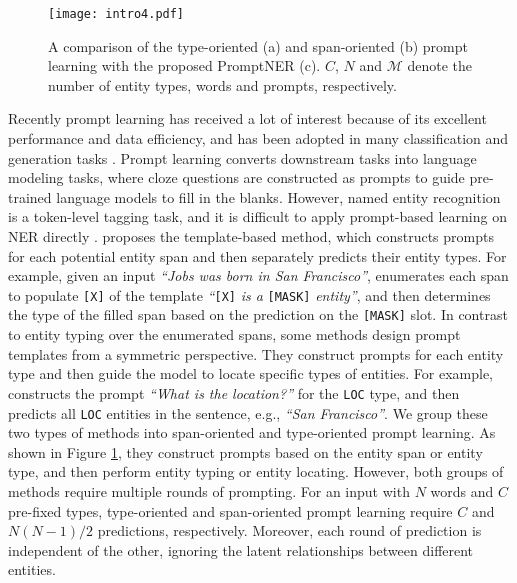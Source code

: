 \documentclass[11pt]{article}
\begin{document}
\begin{figure}[t!]
    \centering
    \texttt{[image: intro4.pdf]}
    \caption{A comparison of the type-oriented (a) and span-oriented (b) prompt learning with the proposed PromptNER (c). $C$, $N$ and $\mathcal{M}$ denote the number of entity types, words and prompts, respectively.}
    \label{fig:comparison}
\end{figure}

Recently prompt learning \citep{https://doi.org/10.48550/arxiv.2107.13586, GPTUnderstand, li-liang-2021-prefix, lester-etal-2021-power} has received a lot of interest because of its excellent performance and data efficiency, and has been adopted in many classification and generation tasks \citep{gao-etal-2021-making, schick-schutze-2021-just, ding2021prompt, wu2022towards}.
Prompt learning converts downstream tasks into language modeling tasks, where cloze questions are constructed as prompts to guide pre-trained language models to fill in the blanks. 
However, named entity recognition is a token-level tagging task, and it is difficult to apply prompt-based learning on NER directly \citep{https://doi.org/10.48550/arxiv.2107.13586}.
\citet{cui-etal-2021-template} proposes the template-based method, which constructs prompts for each potential entity span and then separately predicts their entity types.
For example, given an input \textit{``Jobs was born in San Francisco''}, \citet{cui-etal-2021-template} enumerates each span to populate \texttt{[X]} of the template \textit{``}\texttt{[X]}\textit{ is a }\texttt{[MASK]}\textit{ entity''}, and then determines the type of the filled span based on the prediction on the \texttt{[MASK]} slot.
In contrast to entity typing over the enumerated spans, some methods \citep{li-etal-2020-unified, liu2022qaner} design prompt templates from a symmetric perspective. They construct prompts for each entity type and then guide the model to locate specific types of entities.
For example, \citet{liu2022qaner} constructs the prompt \textit{``What is the location?''} for the \texttt{LOC} type, and then predicts all \texttt{LOC} entities in the sentence, e.g., \textit{``San Francisco''}.
We group these two types of methods into span-oriented and type-oriented prompt learning. As shown in Figure \ref{fig:comparison}, they construct prompts based on the entity span or entity type, and then perform entity typing or entity locating. However, both groups of methods require multiple rounds of prompting. For an input with $N$ words and $C$ pre-fixed types, type-oriented and span-oriented prompt learning require $C$ and ${N(N-1)}/{2}$ predictions, respectively. Moreover, each round of prediction is independent of the other, ignoring the latent relationships between different entities.
\end{document}
